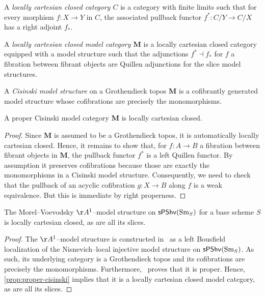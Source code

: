 \begin{definition}
  A \emph{locally cartesian closed category \(C\)} is a category with finite
  limits such that for every morphism \(f\colon X\to Y\) in \(C\), the
  associated pullback functor \(f^{*}\colon C/Y \to C/X\) has a right adjoint
  \(f_{*}\).

  A \emph{locally cartesian closed model category \(\mathbf M\)} is a locally
  cartesian closed category equipped with a model structure such that the
  adjunctions \(f^{*}\dashv f_{*}\) for \(f\) a fibration between fibrant
  objects are Quillen adjunctions for the slice model structures.
\end{definition}

\begin{definition}
  A \emph{Cisinski model structure} on a Grothendieck topos \(\mathbf M\) is a
  cofibrantly generated model structure whose cofibrations are precisely the
  monomorphisms.
\end{definition}

\begin{proposition}\label{prop:proper-cisinski}
  A proper Cisinski model category \(\mathbf M\) is locally cartesian closed.
\end{proposition}
\begin{proof}
  Since \(\mathbf M\) is assumed to be a Grothendieck topos, it is automatically
  locally cartesian closed. Hence, it remains to show that, for \(f\colon A\to
  B\) a fibration between fibrant objects in \(\mathbf M\), the pullback functor
  \(f^*\) is a left Quillen functor. By assumption it preserves cofibrations
  because those are exactly the monomorphisms in a Cisinski model structure.
  Consequently, we need to check that the pullback of an acyclic cofibration
  \(g\colon X\to B\) along \(f\) is a weak equivalence. But this is immediate by
  right properness.
\end{proof}

\begin{corollary}
  The Morel--Voevodsky \(\AA^1\)--model structure on \(\operatorname{\textnormal{\textsf{sPShv}}}(\operatorname{\textnormal{Sm}}_{S})\) for a
  base scheme \(S\) is locally cartesian closed, as are all its slices.
\end{corollary}
\begin{proof}
  The \(\AA^1\)--model structure is constructed in~\cite{mv} as a left Bousfield
  localization of the Nisnevich--local injective model structure on
  \(\operatorname{\textnormal{\textsf{sPShv}}}(\operatorname{\textnormal{Sm}}_{S})\). As such, its underlying category is a Grothendieck topos
  and its cofibrations are precisely the monomorphisms. Furthermore,~\cite{mv}
  proves that it is proper. Hence, \autoref{prop:proper-cisinski} implies that
  it is a locally cartesian closed model category, as are all its slices.
\end{proof}

